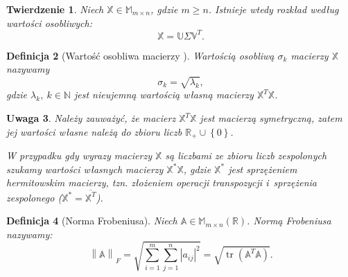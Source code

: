 \documentclass[12pt,a4paper]{report}
\newtheorem{df}{Definicja}[chapter]
\newtheorem{tw}[df]{Twierdzenie}
\newtheorem{uwaga}[df]{Uwaga}
\newcommand{\set}[1]{\left\lbrace {#1} \right\rbrace}
\newcommand{\setR}{\mathbb{R}}
\newcommand{\setN}{\mathbb{N}}
\newcommand{\norm}[2][]{\left\| {#2} \right\|_{#1}}
\newcommand{\tr}[1]{\operatorname{tr}\left({#1} \right)}
\begin{document}
\begin{tw}{\citep{tsvdalra}}
Niech $\mathbb{X} \in \mathbb{M}_{m \times n} $, gdzie $m\geq n$. Istnieje wtedy rozkład według wartości osobliwych:
$$
\mathbb{X} = \mathbb{U} \Sigma \mathbb{V}^T.
$$
\end{tw}

\begin{df}[Wartość osobliwa macierzy \citep{woin}]
Wartością osobliwą $\sigma_k$ macierzy $\mathbb{X}$ nazywamy
$$
\sigma_k = \sqrt{\lambda_k},
$$
gdzie $\lambda_k, \: k \in \setN$ jest nieujemną wartością własną macierzy $\mathbb{X}^T \mathbb{X}$.
\end{df}
\begin{uwaga}
Należy zauważyć, że macierz $\mathbb{X}^T \mathbb{X}$ jest macierzą symetryczną, zatem jej wartości własne należą do zbioru liczb $\setR_{+} \cup \set{0}$.

W przypadku gdy wyrazy macierzy $\mathbb{X}$ są liczbami ze zbioru liczb zespolonych szukamy wartości własnych macierzy $\mathbb{X}^*\mathbb{X}$, gdzie $\mathbb{X}^*$ jest sprzężeniem hermitowskim macierzy, tzn. złożeniem operacji transpozycji i~sprzężenia zespolonego ($\mathbb{X}^* = \overline{\mathbb{X}^T}$).
\end{uwaga}

\begin{df}[Norma Frobeniusa{\citep{ulafiir}}] %
Niech $\mathbb{A}\in \mathbb{M}_{m\times n}(\mathbb{R})$. Normą Frobeniusa nazywamy:
$$
{\norm{\mathbb{A}}}_F = \sqrt{\sum_{i=1}^m \sum_{j=1}^n |a_{ij}|^2} = \sqrt{\tr{\mathbb{A}^T \mathbb{A}}}.
$$
\end{df}
\end{document}
